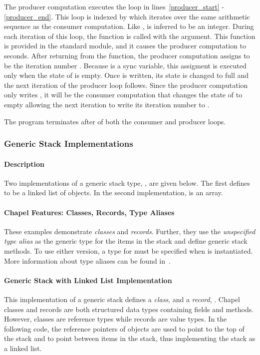 The producer computation executes the  loop in lines~\ref{producer_start} -
\ref{producer_end}.  This
loop is indexed by  which iterates over the same arithmetic sequence
as the consumer computation.  Like ,  is inferred to be an integer.
During each iteration of this  loop, the  function is
called with the argument.  This  function is provided
in the  standard module, and it causes the producer computation to
 seconds.  After returning from the  function, 
the producer computation assigns  to be the iteration number .  
Because  is a sync variable, this assigment is executed only when the state of 
 is empty.  Once  is written, its state is changed to full and the
next iteration of the producer loop follows.  Since the producer computation only
writes , it will be the consumer computation that changes the state of
 to empty allowing the next iteration to write its iteration number
to .

The program terminates after  of both the consumer and
producer loops.

\subsubsection{Generic Stack Implementations}
\paragraph{Description}
Two implementations of a generic stack type, , are given below.  The first
defines  to be a linked list of  objects.  In
the second implementation,  is an array.  

\paragraph{Chapel Features:  Classes, Records, Type Aliases}
These examples demonstrate {\em classes} and {\em records}.  Further, they
use the {\em unspecified type alias}  as the generic type for the items
in the stack and define generic stack methods.  To use either version,
a type for  must be specified when  is instantiated.
More information about type aliases can be found 
in~.

\paragraph{Generic Stack with Linked List Implementation}
This implementation of a generic stack defines a {\em class},
 and a {\em record}, .  Chapel classes and records
are both structured data types containing fields and methods.  However,
classes are reference types while records are value types.  In the following
code, the reference pointers of  objects are used to point to
the top of the stack and to point between items in the stack,
thus implementing the stack as a linked list.

